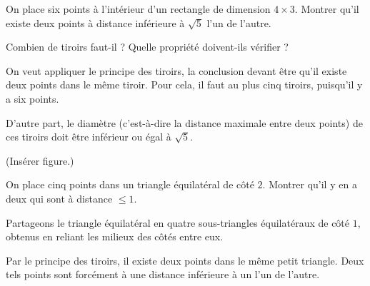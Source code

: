 \begin{exo}
On place six points à l'intérieur d'un rectangle de dimension $4\times 3$. Montrer qu'il existe deux points à distance  inférieure à $\sqrt 5$ l'un de l'autre.
\begin{hint}
Combien de tiroirs faut-il ? Quelle propriété doivent-ils vérifier ?
\end{hint}
\begin{sol}
On veut appliquer le principe des tiroirs, la conclusion devant être qu'il existe deux points dans le même tiroir. Pour cela, il faut au plus cinq tiroirs, puisqu'il y a six points.

D'autre part, le diamètre (c'est-à-dire la distance maximale entre deux points) de ces tiroirs doit être inférieur ou égal à $\sqrt 5$. 

(Insérer figure.)%
\end{sol}
\end{exo}

\begin{exo}
On place cinq points dans un triangle équilatéral de côté $2$. Montrer qu'il y en a deux qui sont à distance $\leq 1$.
\begin{sol}
Partageons le triangle équilatéral en quatre sous-triangles équilatéraux de côté $1$, obtenus en reliant les milieux des côtés entre eux.

Par le principe des tiroirs, il existe deux points dans le même petit triangle. Deux tels points sont forcément à une distance inférieure à un l'un de l'autre.
\end{sol}
\end{exo}



